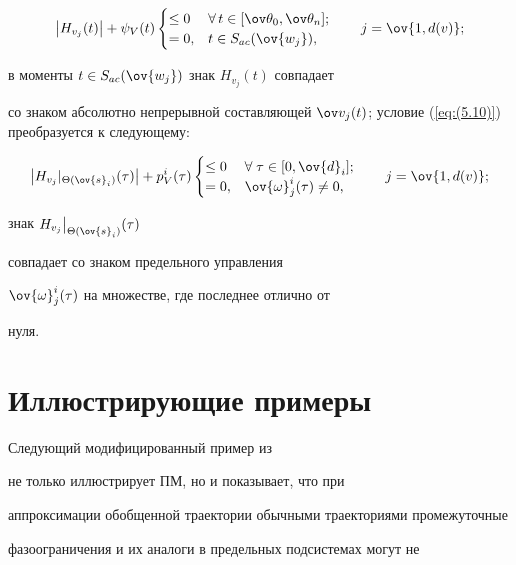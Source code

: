 $$


\big|{H}_{v_j}(t)\big|+\psi_V(t)


\begin{cases}


\leq 0 & \forall \, t\in [\ov\theta_0,\ov\theta_n]; \\


=0, & t\in S_{ac}(\ov{ w_j}),


\end{cases}\qquad j=\ov{1,d(v)};


$$


в моменты $t\in S_{ac}(\ov{ w_j})$ знак ${H}_{v_j}(t)$ совпадает


со знаком абсолютно непрерывной составляющей $\ov


v_j(t)$; условие (\ref{eq:(5.10)}) преобразуется к следующему:


$$


\big|{H}_{v_j}|_{ \Theta(\ov{s}_i)}(\tau)\big|+p_V^i(\tau)


\begin{cases}


\leq 0 & \forall \; \tau\in [0,\ov{d}_i]; \\


=0, & \ov{\omega}^i_j(\tau)\ne0,


\end{cases} \qquad j=\ov{1,d(v)};


$$


знак ${H}_{v_j}\big|_{ \Theta(\ov{s}_i)}(\tau)$


совпадает со знаком предельного управления


$\ov{\omega}^i_j(\tau)$ на множестве, где последнее отлично от


нуля.





\section{Иллюстрирующие примеры}





Следующий модифицированный пример из


\cite{204} не только иллюстрирует ПМ, но и показывает, что при


аппроксимации обобщенной траектории обычными траекториями промежуточные


фазоограничения и их аналоги в предельных подсистемах могут не


